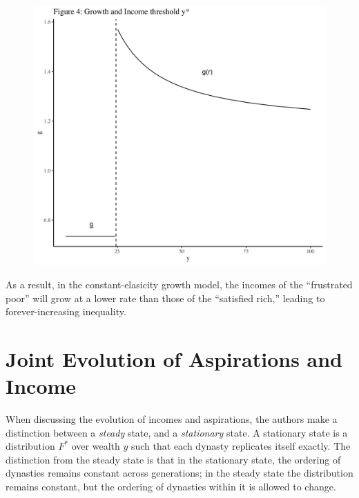 \documentclass[11pt]{article}
\begin{document}
    \begin{figure}[!ht]
        \centering
        \includegraphics[scale = 0.14]{figures/fig4.jpg}
    \end{figure}
    \newpage
    As a result, in the constant-elasicity growth model, the incomes of the ``frustrated poor'' will grow at a lower rate than those of the ``satisfied rich,'' leading to forever-increasing inequality. 
    \section{Joint Evolution of Aspirations and Income}

    When discussing the evolution of incomes and aspirations, the authors make a distinction between a \textit{steady} state, and a \textit{stationary} state. A stationary state is a distribution \( F^* \) over wealth \( y \) such that each dynasty replicates itself exactly. The distinction from the steady state is that in the stationary state, the ordering of dynasties remains constant across generations; in the steady state the distribution remains constant, but the ordering of dynasties within it is allowed to change. 
\end{document}
